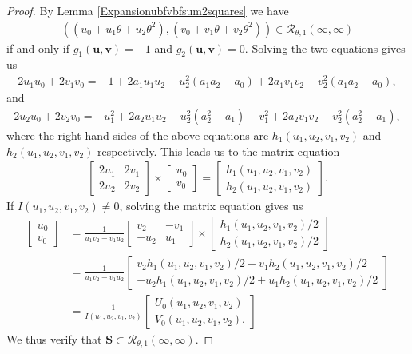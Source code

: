 \documentclass[12pt]{amsart}
\newcommand{\1}{\mathmybb{1}}
\begin{document}
\begin{proof}
By Lemma \ref{Expansionubfvbfsum2squares} we have 
\begin{align*}
\left((u_{0}+u_{1}\theta+u_{2}\theta^2),(v_{0}+v_{1}\theta+v_{2}\theta^2)\right) \in \mathcal{R}_{\theta,1}(\infty,\infty)
\end{align*}
if and only if $g_{1}(\mathbf{u},\mathbf{v}) = -1$ and $g_{2}(\mathbf{u},\mathbf{v}) = 0$. Solving the two equations gives us
\begin{align*}
2u_{1}u_{0}+2v_{1}v_{0} = -1+2a_{1}u_{1}u_{2}-u_{2}^2(a_{1}a_{2}-a_{0})+2a_{1}v_{1}v_{2}-v_{2}^2(a_{1}a_{2}-a_{0}),
\end{align*}
and
\begin{align*}
2u_{2}u_{0}+2v_{2}v_{0} = -u_{1}^2+2a_{2}u_{1}u_{2}-u_{2}^2(a_{2}^2-a_{1}) -v_{1}^2+2a_{2}v_{1}v_{2}-v_{2}^2(a_{2}^2-a_{1}),
\end{align*}
where the right-hand sides of the above equations are $h_{1}(u_{1},u_{2},v_{1},v_{2})$ and $h_{2}(u_{1},u_{2},v_{1},v_{2})$ respectively. This leads us to the matrix equation
\begin{align*}
\begin{bmatrix}
2u_{1} & 2v_{1}\\
2u_{2} & 2v_{2}
\end{bmatrix}
\times
\begin{bmatrix}
u_{0} \\
v_{0}
\end{bmatrix}
=
\begin{bmatrix}
h_{1}(u_{1},u_{2},v_{1},v_{2})\\
h_{2}(u_{1},u_{2},v_{1},v_{2})
\end{bmatrix}
.
\end{align*}
If $I(u_{1},u_{2},v_{1},v_{2}) \neq 0$, solving the matrix equation gives us
\begin{align*}
\begin{bmatrix}
u_{0}\\
v_{0}
\end{bmatrix}
&= \frac{1}{u_{1}v_{2}-v_{1}u_{2}}
\begin{bmatrix}
v_{2} & -v_{1}\\
-u_{2} & u_{1}
\end{bmatrix}
\times
\begin{bmatrix}
h_{1}(u_{1},u_{2},v_{1},v_{2})/2\\
h_{2}(u_{1},u_{2},v_{1},v_{2})/2
\end{bmatrix}
\\
&= \frac{1}{u_{1}v_{2}-v_{1}u_{2}}
\begin{bmatrix}
v_{2} h_{1}(u_{1},u_{2},v_{1},v_{2})/2 - v_{1} h_{2}(u_{1},u_{2},v_{1},v_{2})/2 \\
-u_{2} h_{1}(u_{1},u_{2},v_{1},v_{2})/2 +u_{1}h_{2}(u_{1},u_{2},v_{1},v_{2})/2
\end{bmatrix}\\
&=\frac{1}{I(u_{1},u_{2},v_{1},v_{2})}
\begin{bmatrix}
U_{0}(u_{1},u_{2},v_{1},v_{2})\\
V_{0}(u_{1},u_{2},v_{1},v_{2}).
\end{bmatrix}
\end{align*}
We thus verify that $\mathbf{S}\subset \mathcal{R}_{\theta,1}(\infty,\infty)$.
\end{proof}
\end{document}
